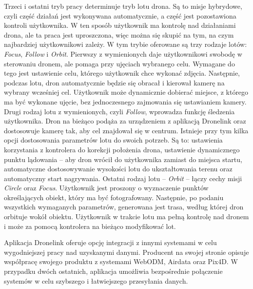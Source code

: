Trzeci i ostatni tryb pracy determinuje tryb lotu drona. Są to misje hybrydowe, czyli część działań jest wykonywana automatycznie, a część jest pozostawiona kontroli użytkownika. W ten sposób użytkownik ma kontrolę nad działaniami drona, ale ta praca jest uproszczona, więc można się skupić na tym, na czym najbardziej użytkownikowi zależy. W tym trybie oferowane są trzy rodzaje lotów: \textit{Focus}, \textit{Follow} i \textit{Orbit}. Pierwszy z wymienionych daje użytkownikowi swobodę w sterowaniu dronem, ale pomaga przy ujęciach wybranego celu. Wymagane do tego jest ustawienie celu, którego użytkownik chce wykonać zdjęcia. Następnie, podczas lotu, dron automatycznie będzie się obracał i kierował kamerę na wybrany wcześniej cel. Użytkownik może dynamicznie dobierać miejsce, z którego ma być wykonane ujęcie, bez jednoczesnego zajmowania się ustawianiem kamery. Drugi rodzaj lotu z wymienionych, czyli \textit{Follow}, wprowadza funkcję śledzenia użytkownika. Dron na bieżąco podąża za urządzeniem z aplikacją Dronelink oraz dostosowuje kamerę tak, aby cel znajdował się w centrum. Istnieje przy tym kilka opcji dostosowania parametrów lotu do swoich potrzeb. Są to: ustawienia korzystania z kontrolera do korekcji położenia drona, ustawienie dynamicznego punktu lądowania – aby dron wrócił do użytkownika zamiast do miejsca startu, automatyczne dostosowywanie wysokości lotu do ukształtowania terenu oraz automatyczny start nagrywania. Ostatni rodzaj lotu – \textit{Orbit} – łączy cechy misji \textit{Circle} oraz \textit{Focus}. Użytkownik jest proszony o wyznaczenie punktów określających obiekt, który ma być fotografowany. Następnie, po podaniu wszystkich wymaganych parametrów, generowana jest trasa, według której dron orbituje wokół obiektu. Użytkownik w trakcie lotu ma pełną kontrolę nad dronem i może za pomocą kontrolera na bieżąco modyfikować lot. 

Aplikacja Dronelink oferuje opcję integracji z innymi systemami w celu wygodniejszej pracy nad uzyskanymi danymi. Producent na swojej stronie opisuje współpracę swojego produktu z systemami WebODM, Airdata oraz Pix4D. W przypadku dwóch ostatnich, aplikacja umożliwia bezpośrednie połączenie systemów w celu szybszego i łatwiejszego przesyłania danych.

